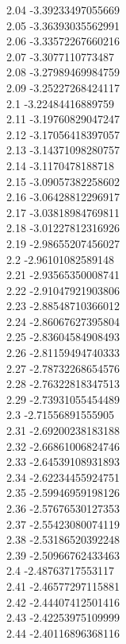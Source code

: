 {2.04	-3.39233497055669\\
2.05	-3.36393035562991\\
2.06	-3.33572267660216\\
2.07	-3.3077110773487\\
2.08	-3.27989469984759\\
2.09	-3.25227268424117\\
2.1	-3.22484416889759\\
2.11	-3.19760829047247\\
2.12	-3.17056418397057\\
2.13	-3.14371098280757\\
2.14	-3.1170478188718\\
2.15	-3.09057382258602\\
2.16	-3.06428812296917\\
2.17	-3.03818984769811\\
2.18	-3.01227812316926\\
2.19	-2.98655207456027\\
2.2	-2.96101082589148\\
2.21	-2.93565350008741\\
2.22	-2.91047921903806\\
2.23	-2.88548710366012\\
2.24	-2.86067627395804\\
2.25	-2.83604584908493\\
2.26	-2.81159494740333\\
2.27	-2.78732268654576\\
2.28	-2.76322818347513\\
2.29	-2.73931055454489\\
2.3	-2.71556891555905\\
2.31	-2.69200238183188\\
2.32	-2.66861006824746\\
2.33	-2.64539108931893\\
2.34	-2.62234455924751\\
2.35	-2.59946959198126\\
2.36	-2.57676530127353\\
2.37	-2.55423080074119\\
2.38	-2.53186520392248\\
2.39	-2.50966762433463\\
2.4	-2.48763717553117\\
2.41	-2.46577297115881\\
2.42	-2.44407412501416\\
2.43	-2.42253975109999\\
2.44	-2.40116896368116\\
}
